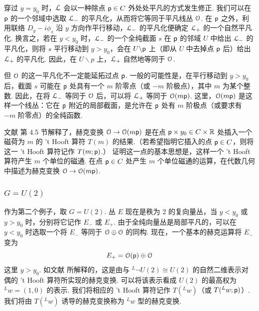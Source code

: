 穿过 $y=y_0$ 时，${\mathcal L}$ 会以一种除点 ${\sf p}\in C$ 外处处平凡的方式发生修正.
我们可以在 ${\sf p}$ 的一个邻域中选取 ${\mathcal L}_-$ 的平凡化，从而将它等同于平凡线丛 ${\mathcal O}$.
在 ${\sf p}$ 之外，利用联络 $D_y-i\phi_s$ 沿 $y$ 方向作平行移动，${\mathcal L}_-$ 的平凡化便确定 ${\mathcal L}_+$ 的一个自然平凡化. 换言之，若在 $y<y_0$ 时，${\mathcal L}_-$ 的一个全纯截面 $s$ 在 ${\sf p}$ 的邻域 $U$ 中给出 ${\mathcal L}_-$ 的平凡化，则将 $s$ 平行移动到 $y>y_0$，会在 $U\backslash {\sf p}$ 上（即从 $U$ 中去掉点 ${\sf p}$ 后）给出 ${\mathcal L}_+$ 的平凡化.
因此，在 $U\backslash p$ 上，${\mathcal L}_+$ 自然地等同于 ${\mathcal O}$.

但 ${\mathcal O}$ 的这一平凡化不一定能延拓过点 ${\sf p}$. 一般的可能性是，在平行移动到 $y>y_0$ 后，截面 $s$ 可能在 ${\sf p}$ 处具有一个 $m$ 阶零点（或 $-m$ 阶极点），其中 $m$ 为某个整数.
因此，在将 ${\mathcal L}_-$ 等同于 ${\mathcal O}$ 后，可以将 ${\mathcal L}_+$ 等同于 ${\mathcal O}(m{\sf p})$.
这里，${\mathcal O}(m{\sf p})$ 是这样一个线丛：它在 ${\sf p}$ 附近的局部截面，是允许在 ${\sf p}$ 处有 $m$ 阶极点（或要求有 $-m$ 阶零点）的全纯函数.

文献 \cite{KW} 第 4.5 节解释了，赫克变换 ${\mathcal O}\to {\mathcal O}(m{\sf p})$ 是在点 ${\sf p}\times y_0\in
C\times {\mathbb R}$ 处插入一个磁荷为 $m$ 的 't Hooft 算符 $T(m)$ 的结果.（若希望指明它插入的点 ${\sf p}\in C$，则将这一 't Hooft 算符记作 $T(m;{\sf p})$.）
证明这一点的基本思想是，这样一个 't Hooft 算符产生 $m$ 个单位的磁通. 在点 ${\sf p}\in C$ 处产生 $m$ 个单位磁通的运算，在代数几何中描述为赫克变换 ${\mathcal O}\to {\mathcal O}(m{\sf p})$.

\subsubsection{$G=U(2)$}\label{gutwo}

作为第二个例子，取 $G=U(2)$. 丛 $E$ 现在是秩为 2 的复向量丛，当 $y<y_0$ 或 $y>y_0$ 时，分别将它记作 $E_-$ 或 $E_+$.
由于全纯向量丛是局部平凡的，可以在 $y<y_0$ 时选取一个将 $E_-$ 等同于 ${\mathcal O}\oplus {\mathcal O}$ 的同构.
现在，一个基本的赫克运算将 $E_-$ 变为
\begin{equation}\label{zobbox} E_+ ={\mathcal O}({\sf p})\oplus {\mathcal O}  \end{equation}
这里 $y>y_0$. 如文献 \cite{KW} 所解释的，这是由与 $^L\neg U(2)\cong U(2)$ 的自然二维表示对偶的 't Hooft 算符所实现的赫克变换. 可以将该表示看成 $U(2)$ 的最高权为 $^Lw=(1,0)$ 的表示.
我们将相应的 't Hooft 算符记作 $T(^Lw)$（或 $T(^Lw; {\sf p})$）.
我们将由 $T(^Lw)$ 诱导的赫克变换称为 $^Lw$ 型的赫克变换.

